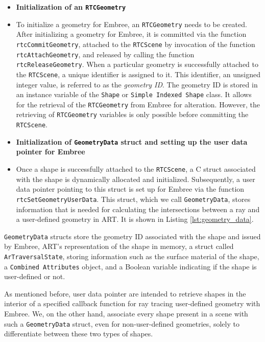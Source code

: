 \begin{itemize}
	\setlength\itemsep{0.05em}
	
	\item \textbf{Initialization of an \texttt{RTCGeometry}}
	\item[] To initialize a geometry for Embree, an \texttt{RTCGeometry} needs to be created. After initializing a geometry for Embree, it is committed via the function \texttt{rtcCommitGeometry}, attached to the \texttt{RTCScene} by invocation of the function \texttt{rtcAttachGeometry}, and released by calling the function \texttt{rtcReleaseGeometry}. When a particular geometry is successfully attached to the \texttt{RTCScene}, a unique identifier is assigned to it. This identifier, an unsigned integer value, is referred to as the \emph{geometry ID}. The geometry ID is stored in an instance variable of the \texttt{Shape} or \texttt{Simple Indexed Shape} class. It allows for the retrieval of the \texttt{RTCGeometry} from Embree for alteration. However, the retrieving of \texttt{RTCGeometry} variables is only possible before committing the \texttt{RTCScene}. 
	\\
	
	\item \textbf{Initialization of \texttt{GeometryData} struct and setting up the user data pointer for Embree}
	\item[] Once a shape is successfully attached to the \texttt{RTCScene}, a C struct associated with the shape is dynamically allocated and initialized. Subsequently, a user data pointer pointing to this struct is set up for Embree via the function \texttt{rtcSetGeometryUserData}. This struct, which we call \texttt{GeometryData}, stores information that is needed for calculating the intersections between a ray and a user-defined geometry in ART. It is shown in Listing \ref{lst:geometry_data}.
	\\
	
\end{itemize}

\texttt{GeometryData} structs store the geometry ID associated with the shape and issued by Embree, ART's representation of the shape in memory, a struct called  \texttt{ArTraversalState}, storing information such as the surface material of the shape, a \texttt{Combined Attributes} object, and a Boolean variable indicating if the shape is user-defined or not.

As mentioned before, user data pointer are intended to retrieve shapes in the interior of a specified callback function for ray tracing user-defined geometry with Embree. We, on the other hand, associate every shape present in a scene with such a \texttt{GeometryData} struct, even for non-user-defined geometries, solely to differentiate between these two types of shapes.

